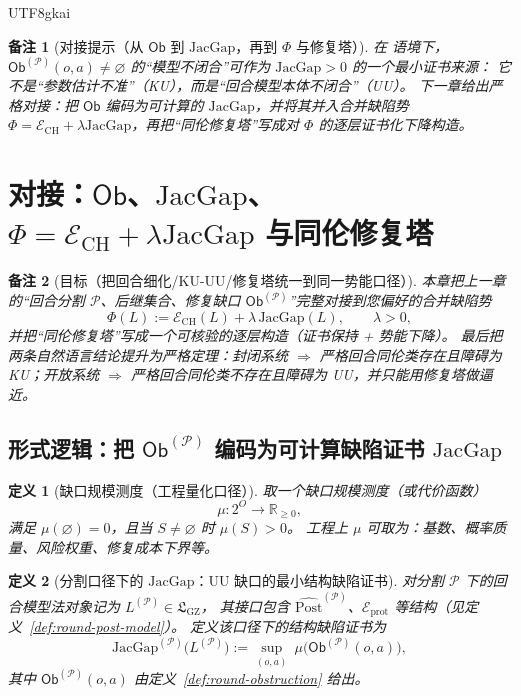 \documentclass[12pt]{article}
\newtheorem{definition}{定义}[section]
\newtheorem{remark}{备注}[section]
\newcommand{\RR}{\mathbb{R}}
\newcommand{\GFramework}{\text{G-Framework}}
\newcommand{\GZLS}{\ensuremath{\mathfrak{L}_{\mathrm{GZ}}}}
\newcommand{\JacGap}{\ensuremath{\mathrm{JacGap}}} %
\begin{document}
\begin{CJK*}{UTF8}{gkai}
\begin{remark}[对接提示（从 $\mathsf{Ob}$ 到 $\JacGap$，再到 $\Phi$ 与修复塔）]
在 \GFramework{} 语境下，$\mathsf{Ob}^{(\mathcal{P})}(o,a)\neq\varnothing$ 的“模型不闭合”可作为 $\JacGap>0$ 的一个最小证书来源：
它不是“参数估计不准”（KU），而是“回合模型本体不闭合”（UU）。
下一章给出严格对接：把 $\mathsf{Ob}$ 编码为可计算的 $\JacGap$，并将其并入合并缺陷势
$\Phi=\mathcal{E}_{\mathrm{CH}}+\lambda\JacGap$，再把“同伦修复塔”写成对 $\Phi$ 的逐层证书化下降构造。
\end{remark}

\section{对接：$\mathsf{Ob}$、$\JacGap$、$\Phi=\mathcal{E}_{\mathrm{CH}}+\lambda\JacGap$ 与同伦修复塔}
\label{sec:ob-jacgap-phi-repair-tower}

\begin{remark}[目标（把回合细化/KU-UU/修复塔统一到同一势能口径）]
本章把上一章的“回合分割 $\mathcal{P}$、后继集合、修复缺口 $\mathsf{Ob}^{(\mathcal{P})}$”完整对接到您偏好的合并缺陷势
\[
  \Phi(L):=\mathcal{E}_{\mathrm{CH}}(L)+\lambda\,\JacGap(L),\qquad \lambda>0,
\]
并把“同伦修复塔”写成一个可核验的逐层构造（证书保持 + 势能下降）。
最后把两条自然语言结论提升为严格定理：封闭系统 $\Rightarrow$ 严格回合同伦类存在且障碍为 KU；开放系统 $\Rightarrow$ 严格回合同伦类不存在且障碍为 UU，并只能用修复塔做逼近。
\end{remark}

\subsection{形式逻辑：把 $\mathsf{Ob}^{(\mathcal{P})}$ 编码为可计算缺陷证书 $\JacGap$}
\label{sec:ob-to-jacgap}

\begin{definition}[缺口规模测度（工程量化口径）]
\label{def:ob-measure-mu}
取一个缺口规模测度（或代价函数）
\[
  \mu:2^{O}\to \RR_{\ge 0},
\]
满足 $\mu(\varnothing)=0$，且当 $S\neq\varnothing$ 时 $\mu(S)>0$。
工程上 $\mu$ 可取为：基数、概率质量、风险权重、修复成本下界等。
\end{definition}

\begin{definition}[分割口径下的 $\JacGap$：UU 缺口的最小结构缺陷证书]
\label{def:jacgap-from-obstruction}
对分割 $\mathcal{P}$ 下的回合模型法对象记为 $L^{(\mathcal{P})}\in\GZLS$，
其接口包含 $\widehat{\mathrm{Post}}^{(\mathcal{P})}$、$\mathcal{E}_{\mathrm{prot}}$ 等结构（见定义~\ref{def:round-post-model}）。
定义该口径下的结构缺陷证书为
\[
  \JacGap^{(\mathcal{P})}\!\bigl(L^{(\mathcal{P})}\bigr)
  :=\sup_{(o,a)}\ \mu\!\bigl(\mathsf{Ob}^{(\mathcal{P})}(o,a)\bigr),
\]
其中 $\mathsf{Ob}^{(\mathcal{P})}(o,a)$ 由定义~\ref{def:round-obstruction} 给出。
\end{definition}


\end{CJK*}
\end{document}

